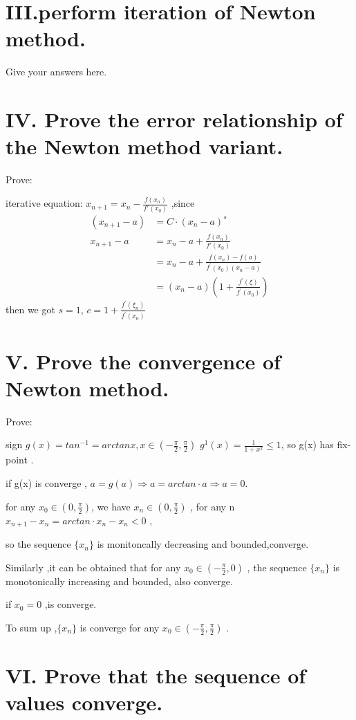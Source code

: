 \documentclass[a4paper]{article}
\begin{document}
\section*{III.perform iteration of Newton method.}

Give your answers here.

\section*{IV. Prove the error relationship of the Newton method variant.}
Prove:

iterative equation: $x_{n+1} = x_{n} - \frac{f(x_{n})}{f'(x_{0})}$ ,since
\begin{align}
   (x_{n+1}-a) & =C \cdot (x_{n}-a)^{s} \\
  x_{n+1}-a & = x_{n}-a+ \frac{f(x_{n})}{f'(x_{0})} \\
  & = x_{n} - a + \frac{f(x_{n})-f(a)}{f^{'}(x_{0})(x_{n}-a)} \\
  & = (x_{n}-a)(1+\frac{f^{'}(\xi)}{f^{'}(x_{0})})
\end{align}
then we got $s=1$, $c=1+\frac{f^{'}(\xi_{n})}{f^{'}(x_{0})}$


\section*{V. Prove the convergence of Newton method.}
Prove:

sign $g(x) = tan^{-1} = arctanx , x \in (-\frac{\pi}{2},\frac{\pi}{2})$
$g^{1}(x) = \frac{1}{1+x^2} \leq 1 $, so g(x) has fix-point .

if g(x) is converge , $a = g(a) \Rightarrow a=arctan \cdot a \Rightarrow a=0 $.

for any $x_{0} \in (0,\frac{\pi}{2})$, we have $x_{n} \in (0,\frac{\pi}{2})$ ,
for any n $x_{n+1}-x_{n} = arctan \cdot x_{n} - x_{n} < 0 $ , 

so the sequence  $\{x_{n}\}$ is monitoncally decreasing and bounded,converge.

Similarly ,it can be obtained that for any $x_{0} \in (-\frac{\pi}{2},0)$ ,
the sequence $\{x_{n}\}$ is monotonically increasing and bounded, also converge.

if $x_{0}=0$ ,is converge.

To sum up ,$\{x_{n}\}$ is converge for any $x_{0} \in (-\frac{\pi}{2},\frac{\pi}{2})$ .

\section*{VI. Prove that the sequence of values converge.}
\end{document}
